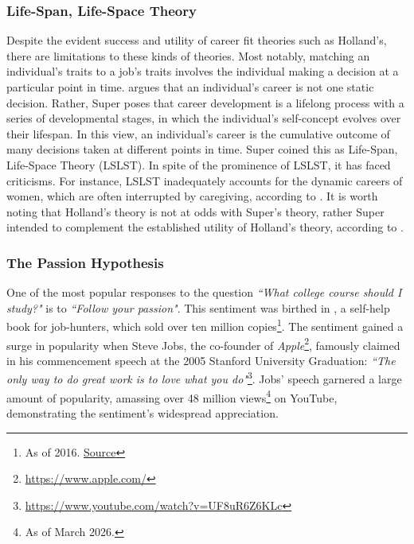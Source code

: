 \subsubsection{Life-Span, Life-Space Theory}

Despite the evident success and utility of career fit theories such as Holland's,
there are limitations to these kinds of theories.
Most notably, matching an individual's traits to a job's traits involves the individual making a decision at a particular point in time.
\cite{super1980life} argues that an individual's career is not one static decision.
Rather, Super poses that career development is a lifelong process with a series of developmental stages,
in which the individual's self-concept evolves over their lifespan.
In this view, an individual's career is the cumulative outcome of many decisions taken at different points in time.
Super coined this as Life-Span, Life-Space Theory (LSLST).
In spite of the prominence of LSLST, it has faced criticisms.
For instance, LSLST inadequately accounts for the
dynamic careers of women, which are often interrupted by caregiving, according to \cite{fitzgerald1994career}.
It is worth noting that Holland's theory is not at odds with Super's theory,
rather Super intended to complement the established utility of Holland's theory, according to \cite{greenhaus2006super}.

\subsubsection{The Passion Hypothesis}

One of the most popular responses to the question \emph{``What college course should I study?"}
is to \emph{``Follow your passion"}.
This sentiment was birthed in \cite{bolles1972color}, a self-help book for job-hunters, which
sold over ten million copies\footnote{As of 2016. \underline{\href{https://www.aol.com/2010/09/28/what-color-is-your-parachute-interview-with-career-guru-richard/?guccounter=1&guce_referrer=aHR0cHM6Ly9lbi53aWtpcGVkaWEub3JnLw&guce_referrer_sig=AQAAAIYayUXI0HpFx1BEoyDOR4RsoOjal-JrxxCqkvOp3vT1rsHLUhYGK5DksTx1_3vi6_WwDIdSCfhTlsy_Q07qIIf4d6esg2gBM8xDt2QLDnjLuDcBEz4-zzTveWLWtbRxajTtxp1I-dqO9nnSxYbWKkZ5S2CDsz0i2ZI7-vPSc5HU}{Source}}}.
The sentiment gained a surge in popularity when Steve Jobs, the co-founder of \emph{Apple}\footnote{\url{https://www.apple.com/}}, 
famously claimed in his commencement speech at the 2005 Stanford University Graduation:
\emph{``The only way to do great work is to love what you do"}\footnote{\url{https://www.youtube.com/watch?v=UF8uR6Z6KLc}}.
Jobs' speech garnered a large amount of popularity, amassing over 48 million views\footnote{As of March 2026.} on YouTube,
demonstrating the sentiment's widespread appreciation.

